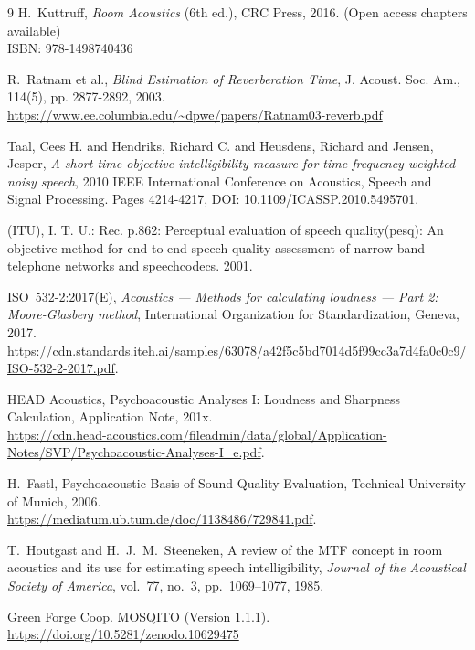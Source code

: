 \documentclass{article}
\begin{document}
\begin{thebibliography}{9}
H.~Kuttruff, \emph{Room Acoustics} (6th ed.), CRC Press, 2016. (Open access chapters available) \\
ISBN: 978-1498740436

R.~Ratnam et al., \emph{Blind Estimation of Reverberation Time}, J. Acoust. Soc. Am., 114(5), pp. 2877-2892, 2003. \\
\url{https://www.ee.columbia.edu/~dpwe/papers/Ratnam03-reverb.pdf}

Taal, Cees H. and Hendriks, Richard C. and Heusdens, Richard and Jensen, Jesper,
 \emph{A short-time objective intelligibility measure for time-frequency weighted noisy speech},
2010 IEEE International Conference on Acoustics, Speech and Signal Processing. Pages 4214-4217,
DOI: 10.1109/ICASSP.2010.5495701.

(ITU), I. T. U.: Rec. p.862: Perceptual evaluation of speech quality(pesq): An objective
method for end-to-end speech quality assessment of narrow-band telephone networks and
speechcodecs. 2001.

ISO~532-2:2017(E),
\textit{Acoustics — Methods for calculating loudness — Part 2: Moore-Glasberg method},
International Organization for Standardization, Geneva, 2017. \\
\url{https://cdn.standards.iteh.ai/samples/63078/a42f5c5bd7014d5f99cc3a7d4fa0c0c9/ISO-532-2-2017.pdf}.

HEAD Acoustics, Psychoacoustic Analyses I: Loudness and Sharpness Calculation, Application Note, 201x. \\
\url{https://cdn.head-acoustics.com/fileadmin/data/global/Application-Notes/SVP/Psychoacoustic-Analyses-I_e.pdf}.

H.~Fastl, Psychoacoustic Basis of Sound Quality Evaluation, Technical University of Munich, 2006.\\
\url{https://mediatum.ub.tum.de/doc/1138486/729841.pdf}.

T.~Houtgast and H.~J.~M.~Steeneken,
A review of the MTF concept in room acoustics and its use for estimating speech intelligibility,
\textit{Journal of the Acoustical Society of America},
vol.~77, no.~3, pp.~1069–1077, 1985.

Green Forge Coop. MOSQITO (Version 1.1.1). \\
\url{https://doi.org/10.5281/zenodo.10629475}


\end{thebibliography}
\end{document}
